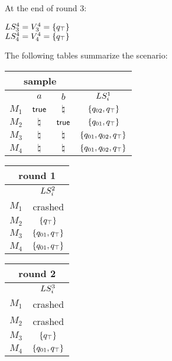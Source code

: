 At the end of round $3$: 

\begin{center} 
$ LS_3^4 = V_3^4 =  \{q_\top\}$ \\
$ LS_4^4 = V_4^4 =  \{q_\top\}$ 
\end{center}


The following tables summarize the scenario:\\

\begin{tabular}{| c |c |c |c|}
\multicolumn{3}{c}{sample} \\
\hline
&$a$&$b$&$LS_i^1$\\
\hline
$M_1$ & $\mathsf{true}$  & $\natural$ & $\{q_{02}, q_\top\}$\\
$M_2$ & $\natural$ & $\mathsf{true}$ &  $\{q_{01}, q_\top\}$\\
$M_3$ & $\natural$ & $\natural$ &  $\{q_{01},q_{02}, 
q_\top\}$ \\
$M_4$ & $\natural$ & $\natural$ &  $\{q_{01}, q_{02}, 
q_\top\}$\\
\hline
\end{tabular} 
\quad
\begin{tabular}{| c |c|}
\multicolumn{2}{c}{round 1} \\
\hline
&$LS_i^2$\\
\hline
$M_1$ & crashed\\
$M_2$ & $\{q_\top\}$\\
$M_3$ & $\{q_{01}, q_\top\}$ \\
$M_4$ & $\{q_{01}, q_\top\}$ \\
\hline
\end{tabular}
\quad
\begin{tabular}{| c |c|}
\multicolumn{2}{c}{round 2} \\
\hline
&$LS_i^3$\\
\hline
$M_1$ & crashed\\
$M_2$ & crashed\\
$M_3$ & $\{q_\top\}$ \\
$M_4$ & $\{q_{01}, q_\top\}$ \\
\hline
\end{tabular} 


